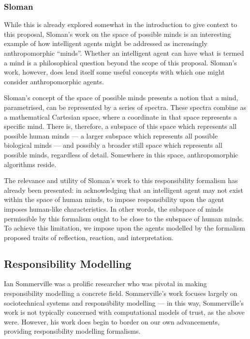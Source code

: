 \subsubsection{Sloman}\label{subsec:space-of-minds}
While this is already explored somewhat in the introduction to give context to this proposal, Sloman's work on the space of possible minds \parencite{Sloman1984TheMinds} is an interesting example of how intelligent agents might be addressed as increasingly anthropomorphic ``minds''. Whether an intelligent agent can have what is termed a mind is a philosophical question beyond the scope of this proposal. Sloman's work, however, does lend itself some useful concepts with which one might consider anthropomorphic agents.\par 

Sloman's concept of the space of possible minds presents a notion that a mind, parametrised, can be represented by a series of spectra. These spectra combine as a mathematical Cartesian space, where a coordinate in that space represents a specific mind. There is, therefore, a subspace of this space which represents all possible human minds --- a larger subspace which represents all possible biological minds --- and possibly a broader still space which represents all possible minds, regardless of detail. Somewhere in this space, anthropomorphic algorithms reside.\par

The relevance and utility of Sloman's work to this responsibility formalism has already been presented: in acknowledging that an intelligent agent may not exist within the space of human minds, to impose responsibility upon the agent imposes human-like characteristics. In other words, the subspace of minds permissible by this formalism ought to be close to the subspace of human minds. To achieve this limitation, we impose upon the agents modelled by the formalism proposed traits of reflection, reaction, and interpretation.\par

\subsection{Responsibility Modelling}
Ian Sommerville was a prolific researcher who was pivotal in making responsibility modelling a concrete field. Sommerville's work focuses largely on sociotechnical systems and responsibility modelling --- in this way, Sommerville's work is not typically concerned with computational models of trust, as the above were. However, his work does begin to border on our own advancements, providing responsibility modelling formalisms.\par

